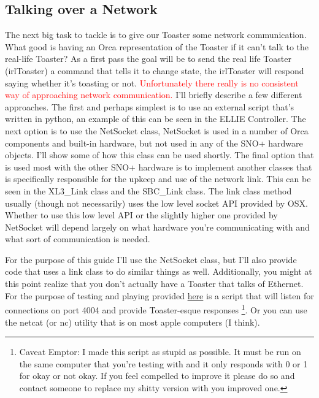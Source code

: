 \documentclass[12pt,a4paper]{article}
\begin{document}
\subsection{Talking over a Network}
The next big task to tackle is to give our Toaster some network communication.
What good is having an Orca representation of the Toaster if it can't talk to the real-life Toaster?
As a first pass the goal will be to send the real life Toaster (irlToaster) a command that tells it to change state, the irlToaster will respond saying whether it's toasting or not.
\textcolor{red}{Unfortunately there really is no consistent way of approaching network communication.}
I'll briefly describe a few different approaches.
The first and perhaps simplest is to use an external script that's written in python, an example of this can be seen in the ELLIE Controller.
The next option is to use the NetSocket class, NetSocket is used in a number of Orca components and built-in hardware, but not used in any of the SNO+ hardware objects.
 I'll show some of how this class can be used shortly.
The final option that is used most with the other SNO+ hardware is to implement another classes that is specifically responsible for the upkeep and use of the network link. 
This can be seen in the XL3\_Link class and the SBC\_Link class.
The link class method usually (though not necessarily) uses the low level socket API provided by OSX.
Whether to use this low level API or the slightly higher one provided by NetSocket will depend largely on what hardware you're communicating with and what sort of communication is needed.

For the purpose of this guide I'll use the NetSocket class, but I'll also provide code that uses a link class to do similar things as well.
Additionally, you might at this point realize that you don't actually have a Toaster that talks of Ethernet. 
For the purpose of testing and playing provided \href{LinkToScript}{here} is a script that will listen for connections on port 4004 and provide Toaster-esque responses
\footnote{Caveat Emptor: I made this script as stupid as possible.
 It must be run on the same computer that you're testing with and it only responds with 0 or 1 for okay or not okay.
  If you feel compelled to improve it please do so and contact someone to replace my shitty version with you improved one.}.
  Or you can use the netcat (or nc) utility that is on most apple computers (I think).
  
\end{document}
